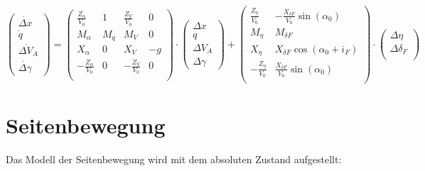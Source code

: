 \begin{equation}\label{eq:laengsbewegung}
	\begin{pmatrix}
		\dot{\Delta x}\\
		\dot{q}\\
		\dot{\Delta V_A}\\
		\dot{\Delta \gamma}
	\end{pmatrix} = 
	\begin{pmatrix}
		\frac{Z_\alpha}{V_0} & 1 & \frac{Z_V}{V_0} & 0\\
		M_\alpha & M_q & M_V & 0\\
		X_\alpha & 0 & X_V & -g\\
		-\frac{Z_\alpha}{V_0} & 0 & -\frac{Z_V}{V_0} & 0\\
	\end{pmatrix} \cdot
	\begin{pmatrix}
		\Delta x\\
		q\\
		\Delta V_A\\
		\Delta \gamma
	\end{pmatrix} + 
	\begin{pmatrix}
		\frac{Z_\eta}{V_0} & -\frac{X_{\delta F}}{V_0} \sin{(\alpha_0)}\\
		M_\eta & M_{\delta F}\\
		X_\eta & X_{\delta F} \cos{(\alpha_0+i_F)}\\
		-\frac{Z_\eta}{V_0} & \frac{X_{\delta F}}{V_0} \sin{(\alpha_0)}\\
	\end{pmatrix}\cdot
	\begin{pmatrix}
		\Delta \eta\\
		\Delta \delta_F\\
	\end{pmatrix}
\end{equation}

\section{Seitenbewegung}
Das Modell der Seitenbewegung wird mit dem absoluten Zustand aufgestellt:

